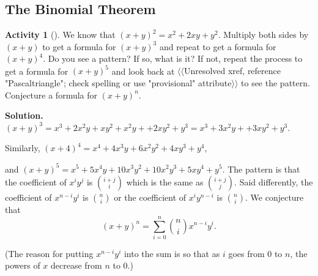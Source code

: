 \documentclass[10pt,]{book}
\theoremstyle{plain}
\theoremstyle{definition}
\newtheorem{activity}[project]{Activity}
\numberwithin{equation}{chapter}
\begin{document}
\subsection[{The Binomial Theorem}]{The Binomial Theorem}\label{subsection-2}
\begin{activity}[]\label{Conjecturebinomthm}
We know that \((x+y)^2 = x^2+2xy+y^2\). Multiply both sides by \((x+y)\) to get a formula for \((x+y)^3\) and repeat to get a formula for \((x+y)^4\). Do you see a pattern? If so, what is it? If not, repeat the process to get a formula for \((x+y)^5\) and look back at {$\langle\langle$Unresolved xref, reference "Pascaltriangle"; check spelling or use "provisional" attribute$\rangle\rangle$} to see the pattern. Conjecture a formula for \((x+y)^n\).%
\par\medskip\noindent%
\textbf{Solution.}\quad \((x+y)^3=x^3+2x^2y +xy^2+x^2y+ +2xy^2 +y^3=x^3+3x^2y++3xy^2+y^3\).%
\par
Similarly, \((x+4)^4=x^4+4x^3y+6x^2y^2+4xy^3+y^4\),%
\par
and \((x+y)^5=x^5+5x^4y+10x^3y^2+10x^2y^3+5xy^4+y^5.\) The pattern is that the coefficient of \(x^iy^j\) is \(i+j\choose i\) which is the same as \(i+j\choose j\). Said differently, the coefficient of \(x^{n-i}y^i\) is \(n\choose i\) or the coefficient of \(x^iy^{n-i}\) is \(n\choose
i\). We conjecture that%
\begin{equation*}
(x+y)^n=\sum_{i=0}^n {n\choose i}x^{n-i}y^i.
\end{equation*}
%
\par
(The reason for putting \(x^{n-i}y^i\) into the sum is so that as \(i\) goes from 0 to \(n\), the powers of \(x\) decrease from \(n\) to 0.)%
\end{activity}
\end{document}
